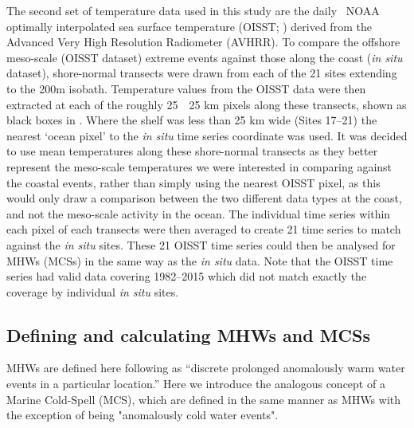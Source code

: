 \documentclass[a4paper,10pt,review]{elsarticle}
\begin{document}
The second set of temperature data used in this study are the daily \degree~NOAA optimally interpolated sea surface temperature (OISST; \cite{Reynolds2007}) derived from the Advanced Very High Resolution Radiometer (AVHRR). To compare the offshore meso-scale (OISST dataset) extreme events against those along the coast (\emph{in situ} dataset), shore-normal transects were drawn from each of the 21 sites extending to the 200m isobath. Temperature values from the OISST data were then extracted at each of the roughly 25~\texttimes~25 km pixels along these transects, shown as black boxes in . Where the shelf was less than 25 km wide (Sites 17--21) the nearest `ocean pixel' to the \emph{in situ} time series coordinate was used. It was decided to use mean temperatures along these shore-normal transects as they better represent the meso-scale temperatures we were interested in comparing against the coastal events, rather than simply using the nearest OISST pixel, as this would only draw a comparison between the two different data types at the coast, and not the meso-scale activity in the ocean. The individual time series within each pixel of each transects were then averaged to create 21 time series to match against the \emph{in situ} sites. These 21 OISST time series could then be analysed for MHWs (MCSs) in the same way as the \emph{in situ} data. Note that the OISST time series had valid data covering 1982--2015 which did not match exactly the coverage by individual \emph{in situ} sites.

\subsection{Defining and calculating MHWs and MCSs}
MHWs are defined here following \citet{Hobday2016} as ``discrete prolonged anomalously warm water events in a particular location.'' Here we introduce the analogous concept of a Marine Cold-Spell (MCS), which are defined in the same manner as MHWs with the exception of being "anomalously cold water events".
\end{document}
